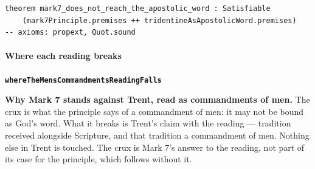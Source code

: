 \documentclass[11pt]{article}
\begin{document}
{\small\begin{verbatim}
theorem mark7_does_not_reach_the_apostolic_word : Satisfiable
    (mark7Principle.premises ++ tridentineAsApostolicWord.premises)
-- axioms: propext, Quot.sound
\end{verbatim}}
\paragraph*{Where each reading breaks}
\leavevmode\par
\par\medskip\noindent\textbf{\texttt{where\allowbreak{}The\allowbreak{}Mens\allowbreak{}Commandments\allowbreak{}Reading\allowbreak{}Falls}}\par\nobreak\noindent
\textbf{Why Mark 7 stands against Trent, read as commandments of men.} The crux is what the principle says of a commandment of men: it may not be bound as God's word. What it breaks is Trent's claim with the reading — tradition received alongside Scripture, and that tradition a commandment of men. Nothing else in Trent is touched. The crux is Mark 7's answer to the reading, not part of its case for the principle, which follows without it.
\end{document}
